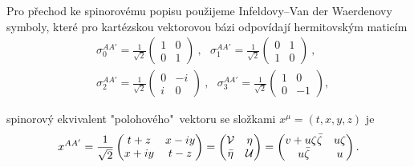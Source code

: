 Pro přechod ke spinorovému popisu použijeme Infeldovy--Van der Waerdenovy symboly, které pro kartézskou
vektorovou bázi odpovídají hermitovským maticím
\begin{equation}
    \label{eq:infeld-van-der-waerden}
    \begin{split}
        &\sigma_0^{AA'}=\frac{1}{\sqrt{2}}\left(\begin{matrix}
            1 & 0 \\
            0 & 1
        \end{matrix}\right)~,~~~ \sigma_1^{AA'}=\frac{1}{\sqrt{2}}\left(\begin{matrix}
            0 & 1 \\
            1 & 0
        \end{matrix}\right)~,\\
        &\sigma_2^{AA'}=\frac{1}{\sqrt{2}}\left(\begin{matrix}
            0 & -i \\
            i & 0
        \end{matrix}\right)~,~~~ \sigma_3^{AA'}=\frac{1}{\sqrt{2}}\left(\begin{matrix}
            1 & 0 \\
            0 & -1
        \end{matrix}\right),
    \end{split}
\end{equation}

spinorový ekvivalent "polohového"\ vektoru se složkami $x^\mu = (t, x, y, z)$ je
\begin{equation}
    \label{eq:spinor_vektor}
    x^{AA'} = \frac{1}{\sqrt{2}} \begin{pmatrix}
        t + z & x - iy \\
        x + iy & t - z
    \end{pmatrix} = \begin{pmatrix}
        \mathcal{V} & \eta \\
        \bar{\eta} & \mathcal{U}
    \end{pmatrix} = \begin{pmatrix}
        v + u \zeta \bar{\zeta} & u \zeta \\
        u \bar{\zeta} & u
    \end{pmatrix}.
\end{equation}

